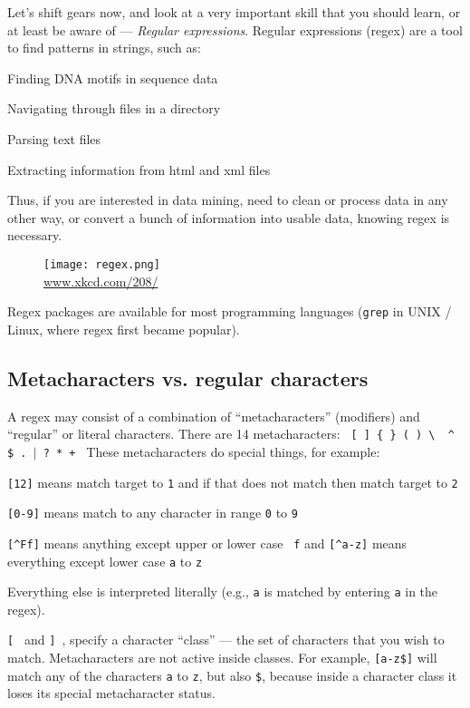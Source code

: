 Let's shift gears now, and look at a very important skill that you 
should learn, or at least be aware of --- {\it Regular expressions}. 
Regular expressions (regex) are a tool to find patterns in strings, 
such as:
\begin{compactitem}
	\item Finding DNA motifs in sequence data
	\item Navigating through files in a directory
	\item Parsing text files
	\item Extracting information from html and xml files
\end{compactitem}
Thus, if you are interested in data mining, need to clean or process 
data in any other way, or convert a bunch of information into usable 
data, knowing regex is necessary. 
\begin{figure}[H] \centering
	\texttt{[image: regex.png]}\\
	\url{www.xkcd.com/208/}
\end{figure}

Regex packages are available for most programming languages ({\tt grep} 
in UNIX / Linux, where regex first became popular).

\subsection{Metacharacters vs. regular characters}
A regex may consist of a combination of ``metacharacters'' (modifiers) 
and ``regular'' or literal characters. There are 14 metacharacters: {\tt 
[ ] \{ \} ( ) \textbackslash~ \^{} \$ . $\vert$ ? * + }     
These metacharacters do special things, for example:
\begin{compactitem}
	\item {\tt [12]} means match target to {\tt 1} and if that does not match
then match target to {\tt 2}
	\item {\tt [0-9]} means match to any character in range {\tt 0} to 
	{\tt 9}
	\item {\tt [\^{}Ff]} means anything except upper or lower case {\tt 
	f} and 
	{\tt [\^{}a-z]} means everything except lower case {\tt a} to {\tt z}
\end{compactitem}
Everything else is interpreted literally (e.g., {\tt a} is matched by 
entering {\tt a} in the regex). 

{\tt [ } and {\tt ] }, specify a character ``class'' --- the set of 
characters that you wish to match. Metacharacters are not active inside 
classes. For example, {\tt [a-z\$]} will match any of the characters 
{\tt a} to {\tt z}, but also {\tt \$}, because inside a character class 
it loses its special metacharacter status.

